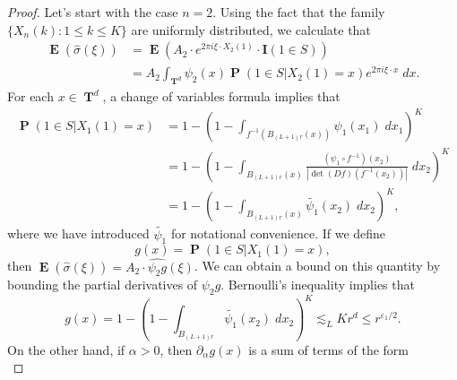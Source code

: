 \documentclass[12pt,reqno]{article}
\numberwithin{equation}{section}
\DeclareMathOperator{\TT}{\mathbf{T}}
\numberwithin{theorem}{section}
\DeclareMathOperator{\EE}{\mathbf{E}}
\DeclareMathOperator{\PP}{\mathbf{P}}
\begin{document}
\begin{proof}


    Let's start with the case $n = 2$. Using the fact that the family $\{ X_n(k) : 1 \leq k \leq K \}$ are uniformly distributed, we calculate that
    \begin{equation} \label{equationDJACIOJCOWIJ}
    \begin{split}
        \EE(\widehat{\sigma}(\xi)) &= \EE ( A_2 \cdot e^{2 \pi i \xi \cdot X_2(1)} \cdot \mathbf{I}(1 \in S) )\\
        &= A_2 \int_{\TT^d} \psi_2(x) \PP \left( 1 \in S | X_2(1) = x \right) e^{2 \pi i \xi \cdot x}\; dx.
    \end{split}
    \end{equation}
    For each $x \in \TT^d$, a change of variables formula implies that
    \begin{equation}
    \begin{split}
        \PP(1 \in S | X_1(1) = x) &= 1 - \left( 1 - \int_{f^{-1}(B_{(L+1)r}(x))} \psi_1(x_1)\; dx_1 \right)^K\\
        &= 1 - \left( 1 - \int_{B_{(L+1) r}(x)} \frac{(\psi_1 \circ f^{-1})(x_2)}{|\det(Df)(f^{-1}(x_2))|}\; dx_2 \right)^K\\
        &= 1 - \left( 1 - \int_{B_{(L+1)r}(x)} \tilde{\psi_1}(x_2)\; dx_2 \right)^K,
    \end{split}
    \end{equation}
    where we have introduced $\tilde{\psi_1}$ for notational convenience. If we define
    \[ g(x) = \PP(1 \in S| X_1(1) = x), \]
    then $\EE(\widehat{\sigma}(\xi)) = A_2 \cdot \widehat{\psi_2 g}(\xi)$. We can obtain a bound on this quantity by bounding the partial derivatives of $\psi_2 g$. Bernoulli's inequality implies that
    \begin{equation}
        g(x) = 1 - \left( 1 - \int_{B_{(L+1)r}} \tilde{\psi_1}(x_2)\; dx_2 \right)^K \lesssim_L K r^d \leq r^{\varepsilon_1/2}.
    \end{equation}
    On the other hand, if $\alpha > 0$, then $\partial_\alpha g(x)$ is a sum of terms of the form
    \begin{equation} \label{equationDOIJACOIJCIOJ3123123214312}

\end{equation}
\end{proof}
\end{document}
